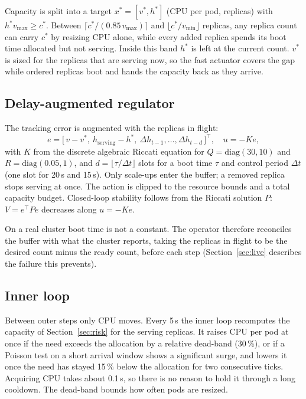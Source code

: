 \documentclass[conference]{IEEEtran}
\begin{document}
Capacity is split into a target $x^\ast=[v^\ast,h^\ast]$ (CPU per pod, replicas) with
$h^\ast v_{\max}\ge c^\ast$. Between $\lceil c^\ast/(0.85\,v_{\max})\rceil$ and
$\lfloor c^\ast/v_{\min}\rfloor$ replicas, any replica count can carry $c^\ast$ by resizing
CPU alone, while every added replica spends its boot time allocated but not serving. Inside
this band $h^\ast$ is left at the current count. $v^\ast$ is sized for the replicas that
are serving now, so the fast actuator covers the gap while ordered replicas boot and hands
the capacity back as they arrive.

\subsection{Delay-augmented regulator}
\label{sec:lqr}

The tracking error is augmented with the replicas in flight:
\begin{equation}
e=\bigl[\,v-v^\ast,\ h_{\mathrm{serving}}-h^\ast,\ \Delta h_{t-1},\dots,\Delta h_{t-d}\,\bigr]^{\top},
\quad u=-Ke,
\end{equation}
with $K$ from the discrete algebraic Riccati equation for $Q=\mathrm{diag}(30,10)$ and
$R=\mathrm{diag}(0.05,1)$, and $d=\lfloor\tau/\Delta t\rfloor$ slots for a boot time $\tau$
and control period $\Delta t$ (one slot for 20\,s and 15\,s). Only scale-ups enter the
buffer; a removed replica stops serving at once. The action is clipped to the resource
bounds and a total capacity budget. Closed-loop stability follows from the Riccati solution
$P$: $V=e^{\top}Pe$ decreases along $u=-Ke$.

On a real cluster boot time is not a constant. The operator therefore reconciles the buffer
with what the cluster reports, taking the replicas in flight to be the desired count minus
the ready count, before each step (Section~\ref{sec:live} describes the failure this
prevents).

\subsection{Inner loop}
\label{sec:inner}

Between outer steps only CPU moves. Every 5\,s the inner loop recomputes the capacity of
Section~\ref{sec:risk} for the serving replicas. It raises CPU per pod at once if the need
exceeds the allocation by a relative dead-band (30\,\%), or if a Poisson test on a short
arrival window shows a significant surge, and lowers it once the need has stayed 15\,\%
below the allocation for two consecutive ticks. Acquiring CPU takes about 0.1\,s, so there
is no reason to hold it through a long cooldown. The dead-band bounds how often pods are
resized.
\end{document}
